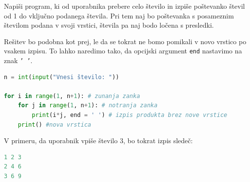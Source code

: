 \begin{zgled}
Napiši program, ki od uporabnika prebere celo število in izpiše poštevanko števil od 1 do vključno podanega števila. Pri tem naj bo poštevanka s posameznim številom podana v svoji vrstici, števila pa naj bodo ločena s presledki.
\end{zgled}
\begin{resitev}
Rešitev bo podobna kot prej, le da se tokrat ne bomo pomikali v novo vrstico po vsakem izpisu. To lahko naredimo tako, da opcijski argument  \texttt{end} nastavimo na znak \texttt{' '}.

\begin{lstlisting}[language=Python]
n = int(input("Vnesi število: "))

for i in range(1, n+1): # zunanja zanka
    for j in range(1, n+1): # notranja zanka
        print(i*j, end = ' ') # izpis produkta brez nove vrstice
    print() #nova vrstica
\end{lstlisting}
V primeru, da uporabnik vpiše število 3, bo tokrat izpis sledeč:
\begin{lstlisting}[language=Python]
1 2 3
2 4 6
3 6 9
\end{lstlisting}
\end{resitev}
